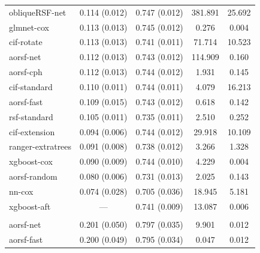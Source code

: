 \documentclass[twoside,11pt]{article}\usepackage[]{graphicx}\usepackage[]{xcolor}
\newenvironment{knitrout}{}{} %
\begin{document}
\begin{knitrout}
\begin{longtable}[t]{lcccc}
\hline
\hspace{1em}obliqueRSF-net & 0.114 (0.012) & 0.747 (0.012) & 381.891 & 25.692\\
\hspace{1em}glmnet-cox & 0.113 (0.013) & 0.745 (0.012) & 0.276 & 0.004\\
\hspace{1em}cif-rotate & 0.113 (0.013) & 0.741 (0.011) & 71.714 & 10.523\\
\hspace{1em}aorsf-net & 0.112 (0.013) & 0.743 (0.012) & 114.909 & 0.160\\
\hspace{1em}aorsf-cph & 0.112 (0.013) & 0.744 (0.012) & 1.931 & 0.145\\
\hspace{1em}cif-standard & 0.110 (0.011) & 0.744 (0.011) & 4.079 & 16.213\\
\hspace{1em}aorsf-fast & 0.109 (0.015) & 0.743 (0.012) & 0.618 & 0.142\\
\hspace{1em}rsf-standard & 0.105 (0.011) & 0.735 (0.011) & 2.510 & 0.252\\
\hspace{1em}cif-extension & 0.094 (0.006) & 0.744 (0.012) & 29.918 & 10.109\\
\hspace{1em}ranger-extratrees & 0.091 (0.008) & 0.738 (0.012) & 3.266 & 1.328\\
\hspace{1em}xgboost-cox & 0.090 (0.009) & 0.744 (0.010) & 4.229 & 0.004\\
\hspace{1em}aorsf-random & 0.080 (0.006) & 0.731 (0.013) & 2.025 & 0.143\\
\hspace{1em}nn-cox & 0.074 (0.028) & 0.705 (0.036) & 18.945 & 5.181\\
\hspace{1em}xgboost-aft & --- & 0.741 (0.009) & 13.087 & 0.006\\
\addlinespace[0.3em]
\multicolumn{5}{l}{\textit{\textbf{VA lung cancer trial; death, n = 137, p = 8}}}\\
\hline
\hspace{1em}aorsf-net & 0.201 (0.050) & 0.797 (0.035) & 9.901 & 0.012\\
\hspace{1em}aorsf-fast & 0.200 (0.049) & 0.795 (0.034) & 0.047 & 0.012\\

\end{longtable}
\end{knitrout}
\end{document}

